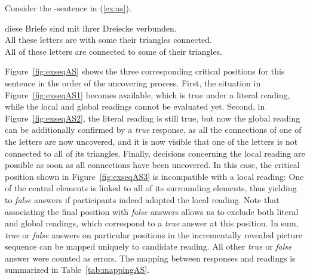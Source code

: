 \documentclass[fleqn,reqno,10pt,draft]{article}
\newcommand{\as}{\acro{as}}
\begin{document}
Consider the \as-sentence in (\ref{ex:as}).
\begin{exe}
\ex \gll {} diese Briefe sind mit  ihrer Dreiecke
  verbunden.\label{ex:as}\\
All these letters are with some their triangles connected.\\
\trans All of these letters are connected to some of their triangles.
\end{exe}
Figure~\ref{fig:exseqAS} shows the three corresponding critical
positions for this sentence in the order of the uncovering
process. First, the situation in Figure~\ref{fig:exseqAS1} becomes
available, which is true under a literal reading, while the local and
global readings cannot be evaluated yet. Second, in
Figure~\ref{fig:exseqAS2}, the literal reading is still true, but now
the global reading can be additionally confirmed by a \emph{true}
response, as all the connections of one of the letters are now
uncovered, and it is now visible that one of the letters is not
connected to all of its triangles. Finally, decisions concerning the
local reading are possible as soon as all connections have been
uncovered. In this case, the critical position shown in
Figure~\ref{fig:exseqAS3} is incompatible with a local reading: One of
the central elements is linked to all of its surrounding elements,
thus yielding to \emph{false} answers if participants indeed adopted
the local reading. Note that associating the final position with
\emph{false} answers allows us to exclude both literal and global
readings, which correspond to a \emph{true} answer at this
position. In sum, \emph{true} or \emph{false} answers on particular
positions in the incrementally revealed picture sequence can be mapped
uniquely to candidate reading. All other \emph{true} or \emph{false}
answer were counted as errors. The mapping between responses and
readings is summarized in Table~\ref{tab:mappingAS}.
\end{document}
